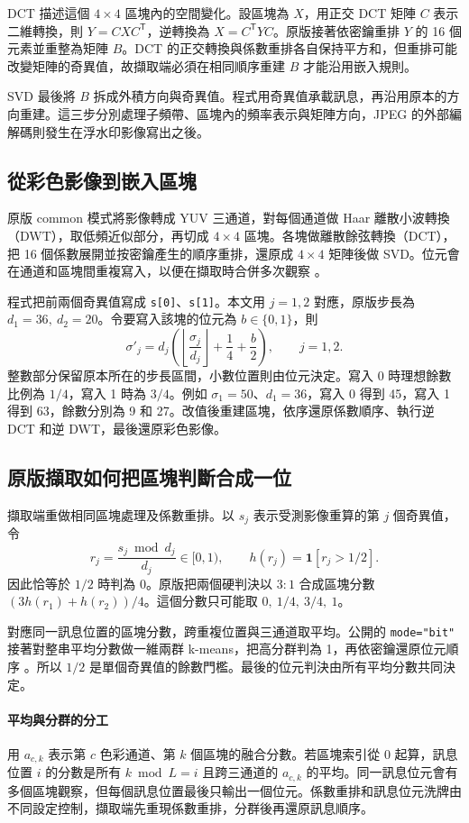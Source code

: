 \documentclass[12pt,a4paper,onecolumn]{article}
\begin{document}
DCT 描述這個 \(4\times4\) 區塊內的空間變化。設區塊為 \(X\)，用正交 DCT 矩陣 \(C\) 表示二維轉換，則 \(Y=CXC^{\mathsf T}\)，逆轉換為 \(X=C^{\mathsf T}YC\)。原版接著依密鑰重排 \(Y\) 的 16 個元素並重整為矩陣 \(B\)。DCT 的正交轉換與係數重排各自保持平方和，但重排可能改變矩陣的奇異值，故擷取端必須在相同順序重建 \(B\) 才能沿用嵌入規則。

SVD 最後將 \(B\) 拆成外積方向與奇異值。程式用奇異值承載訊息，再沿用原本的方向重建。這三步分別處理子頻帶、區塊內的頻率表示與矩陣方向，JPEG 的外部編解碼則發生在浮水印影像寫出之後。

\subsection{從彩色影像到嵌入區塊}
原版 common 模式將影像轉成 YUV 三通道，對每個通道做 Haar 離散小波轉換（DWT），取低頻近似部分，再切成 \(4\times4\) 區塊。各塊做離散餘弦轉換（DCT），把 16 個係數展開並按密鑰產生的順序重排，還原成 \(4\times4\) 矩陣後做 SVD。位元會在通道和區塊間重複寫入，以便在擷取時合併多次觀察 \cite{core}。

程式把前兩個奇異值寫成 \texttt{s[0]}、\texttt{s[1]}。本文用 \(j=1,2\) 對應，原版步長為 \(d_1=36,\ d_2=20\)。令要寫入該塊的位元為 \(b\in\{0,1\}\)，則
\[
 \sigma'_j=d_j\left(\left\lfloor\frac{\sigma_j}{d_j}\right\rfloor
                  +\frac14+\frac{b}{2}\right),\qquad j=1,2.
\]
整數部分保留原本所在的步長區間，小數位置則由位元決定。寫入 0 時理想餘數比例為 \(1/4\)，寫入 1 時為 \(3/4\)。例如 \(\sigma_1=50\)、\(d_1=36\)，寫入 0 得到 45，寫入 1 得到 63，餘數分別為 9 和 27。改值後重建區塊，依序還原係數順序、執行逆 DCT 和逆 DWT，最後還原彩色影像。

\subsection{原版擷取如何把區塊判斷合成一位}
擷取端重做相同區塊處理及係數重排。以 \(s_j\) 表示受測影像重算的第 \(j\) 個奇異值，令
\[
 r_j=\frac{s_j\bmod d_j}{d_j}\in[0,1),\qquad
 h(r_j)=\mathbf 1[r_j>1/2].
\]
因此恰等於 \(1/2\) 時判為 0。原版把兩個硬判決以 \(3:1\) 合成區塊分數 \((3h(r_1)+h(r_2))/4\)。這個分數只可能取 \(0,\ 1/4,\ 3/4,\ 1\)。

對應同一訊息位置的區塊分數，跨重複位置與三通道取平均。公開的 \texttt{mode="bit"} 接著對整串平均分數做一維兩群 k-means，把高分群判為 1，再依密鑰還原位元順序 \cite{core,interface}。所以 \(1/2\) 是單個奇異值的餘數門檻。最後的位元判決由所有平均分數共同決定。

\paragraph{平均與分群的分工}
用 \(a_{c,k}\) 表示第 \(c\) 色彩通道、第 \(k\) 個區塊的融合分數。若區塊索引從 0 起算，訊息位置 \(i\) 的分數是所有 \(k\bmod L=i\) 且跨三通道的 \(a_{c,k}\) 的平均。同一訊息位元會有多個區塊觀察，但每個訊息位置最後只輸出一個位元。係數重排和訊息位元洗牌由不同設定控制，擷取端先重現係數重排，分群後再還原訊息順序。
\end{document}
